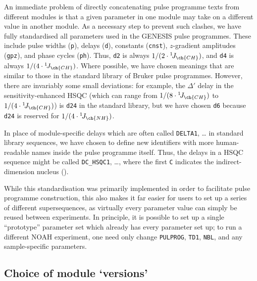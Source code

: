 \documentclass[a4paper,11pt]{article}
\newcommand{\carbon}{\ch{^{13}C}}
\newcommand{\onejch}{{}^1\!J_{\ch{CH}}}
\newcommand{\onejnh}{{}^1\!J_{\ch{NH}}}
\begin{document}
\begin{refsection}
An immediate problem of directly concatenating pulse programme texts from different modules is that a given parameter in one module may take on a different value in another module.
As a necessary step to prevent such clashes, we have fully standardised all parameters used in the GENESIS pulse programmes.
These include pulse widths (\texttt{p}), delays (\texttt{d}), constants (\texttt{cnst}), \(z\)-gradient amplitudes (\texttt{gpz}), and phase cycles (\texttt{ph}).
Thus, \texttt{d2} is always \(1 / (2 \cdot \onejch)\), and \texttt{d4} is always \(1 / (4 \cdot \onejch)\).
Where possible, we have chosen meanings that are similar to those in the standard library of Bruker pulse programmes.
However, there are invariably some small deviations: for example, the \(\Delta'\) delay in the \carbon{} sensitivity-enhanced HSQC (which can range from \(1/(8 \cdot\onejch)\) to \(1/(4 \cdot\onejch)\))\autocite{Schleucher1994JBNMR} is \texttt{d24} in the standard library, but we have chosen \texttt{d6} because \texttt{d24} is reserved for \(1 / (4 \cdot \onejnh)\).

In place of module-specific delays which are often called \texttt{DELTA1}, \ldots{} in standard library sequences, we have chosen to define new identifiers with more human-readable names inside the pulse programme itself.
Thus, the delays in a HSQC sequence might be called \texttt{DC\_HSQC1}, \ldots{}, where the first \texttt{C} indicates the indirect-dimension nucleus (\carbon{}).

While this standardisation was primarily implemented in order to facilitate pulse programme construction, this also makes it far easier for users to set up a series of different supersequences, as virtually every parameter value can simply be reused between experiments.
In principle, it is possible to set up a single ``prototype'' parameter set which already has every parameter set up; to run a different NOAH experiment, one need only change \texttt{PULPROG}, \texttt{TD1}, \texttt{NBL}, and any sample-specific parameters.

\subsection{Choice of module `versions'}


\end{refsection}
\end{document}
